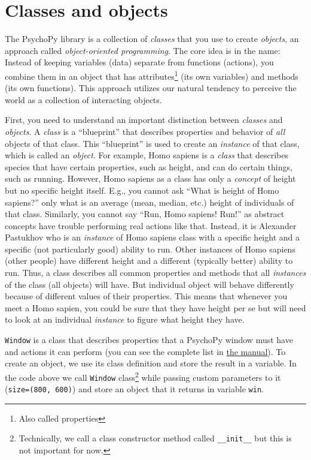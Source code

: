 \documentclass[
]{book}
\begin{document}
\hypertarget{classes-and-objects}{%
\section{Classes and objects}\label{classes-and-objects}}

The PsychoPy library is a collection of \emph{classes} that you use to create \emph{objects}, an approach called \emph{object-oriented programming}. The core idea is in the name: Instead of keeping variables (data) separate from functions (actions), you combine them in an object that has attributes\footnote{Also called properties} (its own variables) and methods (its own functions). This approach utilizes our natural tendency to perceive the world as a collection of interacting objects.

First, you need to understand an important distinction between \emph{classes} and \emph{objects}. A \emph{class} is a ``blueprint'' that describes properties and behavior of \emph{all} objects of that class. This ``blueprint'' is used to create an \emph{instance} of that class, which is called an \emph{object}. For example, Homo sapiens is a \emph{class} that describes species that have certain properties, such as height, and can do certain things, such as running. However, Homo sapiens as a class has only a \emph{concept} of height but no specific height itself. E.g., you cannot ask ``What is height of Homo sapiens?'' only what is an average (mean, median, etc.) height of individuals of that class. Similarly, you cannot say ``Run, Homo sapiens! Run!'' as abstract concepts have trouble performing real actions like that. Instead, it is Alexander Pastukhov who is an \emph{instance} of Homo sapiens class with a specific height and a specific (not particularly good) ability to run. Other instances of Homo sapiens (other people) have different height and a different (typically better) ability to run. Thus, a class describes all common properties and methods that all \emph{instances} of the class (all objects) will have. But individual object will behave differently because of different values of their properties. This means that whenever you meet a Homo sapien, you could be sure that they have height per se but will need to look at an individual \emph{instance} to figure what height they have.

\texttt{Window} is a class that describes properties that a PsychoPy window must have and actions it can perform (you can see the complete list in \href{https://psychopy.org/api/visual/window.html\#psychopy.visual.Window}{the manual}). To create an object, we use its class definition and store the result in a variable. In the code above we call \texttt{Window} class\footnote{Technically, we call a class constructor method called \texttt{\_\_init\_\_} but this is not important for now.} while passing custom parameters to it (\texttt{size=(800,\ 600)}) and store an object that it returns in variable \texttt{win}.
\end{document}
